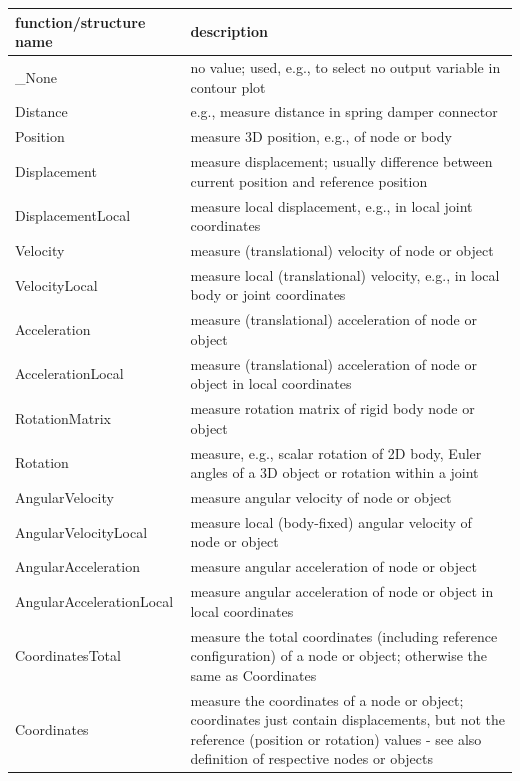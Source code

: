 \begin{center}
\footnotesize
\begin{longtable}{| p{8cm} | p{8cm} |} 
\hline
{\bf function/structure name} & {\bf description}\\ \hline
  \_None & no value; used, e.g., to select no output variable in contour plot\\ \hline  
  Distance & e.g., measure distance in spring damper connector\\ \hline  
  Position & measure 3D position, e.g., of node or body\\ \hline  
  Displacement & measure displacement; usually difference between current position and reference position\\ \hline  
  DisplacementLocal & measure local displacement, e.g., in local joint coordinates\\ \hline  
  Velocity & measure (translational) velocity of node or object\\ \hline  
  VelocityLocal & measure local (translational) velocity, e.g., in local body or joint coordinates\\ \hline  
  Acceleration & measure (translational) acceleration of node or object\\ \hline  
  AccelerationLocal & measure (translational) acceleration of node or object in local coordinates\\ \hline  
  RotationMatrix & measure rotation matrix of rigid body node or object\\ \hline  
  Rotation & measure, e.g., scalar rotation of 2D body, Euler angles of a 3D object or rotation within a joint\\ \hline  
  AngularVelocity & measure angular velocity of node or object\\ \hline  
  AngularVelocityLocal & measure local (body-fixed) angular velocity of node or object\\ \hline  
  AngularAcceleration & measure angular acceleration of node or object\\ \hline  
  AngularAccelerationLocal & measure angular acceleration of node or object in local coordinates\\ \hline  
  CoordinatesTotal & measure the total coordinates (including reference configuration) of a node or object; otherwise the same as Coordinates\\ \hline  
  Coordinates & measure the coordinates of a node or object; coordinates just contain displacements, but not the reference (position or rotation) values - see also definition of respective nodes or objects\\ \hline  

\end{longtable}
\end{center}
